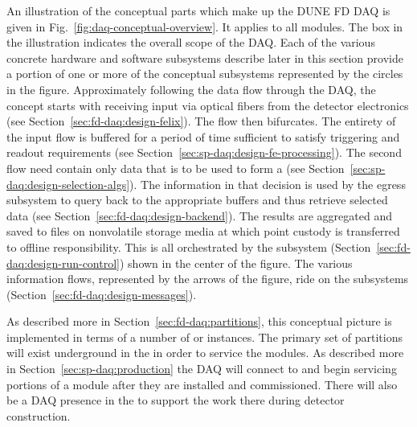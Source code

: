 An illustration of the conceptual parts which make up the DUNE FD DAQ is given in Fig.~\ref{fig:daq-conceptual-overview}. 
It applies to all  modules. 
The box in the illustration indicates the overall scope of the DAQ.
Each of the various concrete hardware and software subsystems describe later in this section provide a portion of one or more of the conceptual subsystems represented by the circles in the figure.
Approximately following the data flow through the DAQ, the concept starts with receiving input via optical fibers from the detector electronics (see Section~\ref{sec:fd-daq:design-felix}). 
The flow then bifurcates. 
The entirety of the input flow is buffered for a period of time sufficient to satisfy triggering and readout requirements (see Section~\ref{sec:sp-daq:design-fe-processing}). 
The second flow need contain only data that is to be used to form a  (see Section~\ref{sec:sp-daq:design-selection-algs}).
The information in that decision is used by the egress subsystem to query back to the appropriate buffers and thus retrieve selected data (see Section~\ref{sec:fd-daq:design-backend}).
The results are aggregated and saved to files on nonvolatile storage media at which point custody is transferred to offline responsibility.
This is all orchestrated by the  subsystem (Section~\ref{sec:fd-daq:design-run-control}) shown in the center of the figure.   The various information flows, represented by the arrows of the figure, ride on the  subsystems (Section~\ref{sec:fd-daq:design-messages}). 


As described more in Section~\ref{sec:fd-daq:partitions}, this conceptual picture is implemented in terms of a number of  or instances. 
The primary set of partitions will exist underground in the  in order to service the  modules. 
As described more in Section~\ref{sec:sp-daq:production} the DAQ will connect to and begin servicing portions of a  module after they are installed and commissioned. 
There will also be a DAQ presence in the  to support the work there during detector construction.




  



